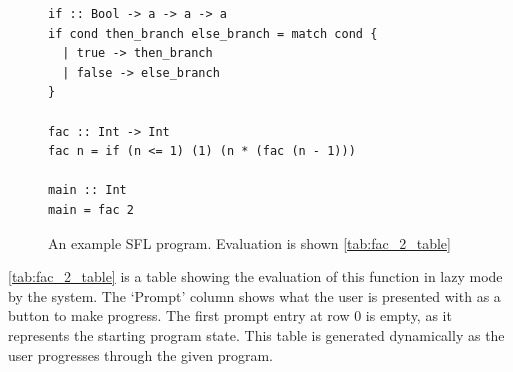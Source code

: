 \begin{figure}[h]
\begin{lstlisting}[language=SFL]
if :: Bool -> a -> a -> a
if cond then_branch else_branch = match cond {
  | true -> then_branch
  | false -> else_branch
}

fac :: Int -> Int
fac n = if (n <= 1) (1) (n * (fac (n - 1)))

main :: Int
main = fac 2
\end{lstlisting}
\caption{An example SFL program. Evaluation is shown \ref{tab:fac_2_table}}
\label{tab:fac_2_table_input}
\end{figure}

\ref{tab:fac_2_table} is a table showing the evaluation of this function in lazy mode by the system. The `Prompt' column shows what the user is presented with as a button to make progress. The first prompt entry at row $0$ is empty, as it represents the starting program state. This table is generated dynamically as the user progresses through the given program.  


